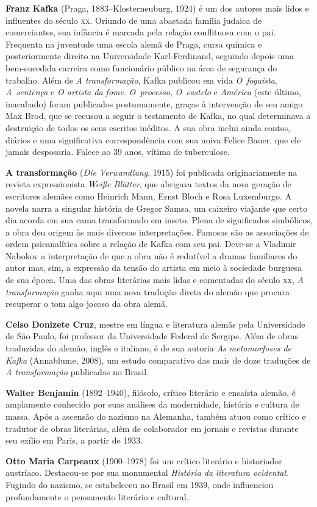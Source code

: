 \textbf{Franz Kafka} (Praga, 1883--Klosterneuburg, 1924) é um dos autores mais lidos 
e influentes do século \textsc{xx}. Oriundo de uma abastada família judaica de
comerciantes, sua infância é marcada pela relação conflituosa com o pai.
Frequenta na juventude uma escola alemã de Praga, cursa química e
posteriormente direito na Universidade Karl{}-Ferdinand, seguindo depois 
uma bem{}-sucedida carreira como funcionário público na área de segurança do trabalho. 
Além de \textit{A transformação}, Kafka publicou em vida \textit{O~foguista}, \textit{A~sentença} e \textit{O artista da fome}. \textit{O~processo}, \textit{O~castelo} e \textit{América} 
(este último, inacabado) foram publicados postumamente, graças à intervenção de 
seu amigo Max Brod, que se recusou a seguir o testamento de Kafka, no qual 
determinava a destruição de todos os seus escritos inéditos. A sua obra inclui
ainda contos, diários e uma significativa correspondência com sua noiva Felice
Bauer, que ele jamais desposaria. Falece ao 39 anos, vítima de tuberculose.

\textbf{A transformação} (\textit{Die Verwandlung}, 1915) foi publicada
originariamente na revista expressionista \textit{Weiße Blätter}, que abrigava
textos da nova geração de escritores alemães como Heinrich Mann, Ernst Bloch e
Rosa Luxemburgo. A novela narra a singular história de Gregor Samsa, um caixeiro
viajante que certo dia acorda em sua cama transformado em inseto. Plena de
significados simbólicos, a obra deu origem às mais diversas interpretações.
Famosas são as associações de ordem psicanalítica sobre a relação de Kafka 
com seu pai. Deve{}-se a Vladimir Nabokov a interpretação de que a obra não é
redutível a dramas familiares do autor mas, sim, a expressão da tensão do artista
em meio à sociedade burguesa de sua época. Uma das obras literárias mais lidas e comentadas
do século \textsc{xx}, \textit{A transformação} ganha aqui uma nova tradução direta do
alemão que procura recuperar o tom algo jocoso da obra alemã.
        
\textbf{Celso Donizete Cruz}, mestre em língua e literatura alemãs pela Universidade de São Paulo, foi professor da Universidade Federal de Sergipe. Além de obras traduzidas do alemão, inglês e italiano, é de sua autoria \textit{As metamorfoses de Kafka} (Annablume, 2008), um estudo comparativo das mais de doze traduções de \textit{A transformação} publicadas no Brasil.

\textbf{Walter Benjamin} (1892--1940), filósofo, crítico literário e ensaísta alemão, é amplamente conhecido por suas análises da modernidade, história e cultura de massa. Após a ascensão do nazismo na Alemanha, também atuou como crítico e tradutor de obras literárias, além de colaborador em jornais e revistas durante seu exílio em Paris, a partir de 1933.

\textbf{Otto Maria Carpeaux} (1900--1978) foi um crítico literário e historiador austríaco. Destacou-se por sua monumental \textit{História da literatura ocidental}. Fugindo do nazismo, se estabeleceu no Brasil em 1939, onde influenciou profundamente o pensamento literário e cultural.



